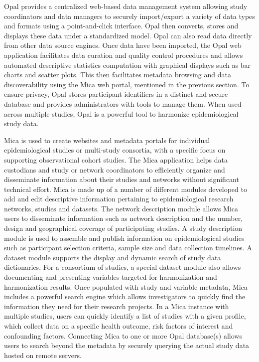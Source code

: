 Opal provides a centralized web-based data management system allowing study coordinators and data managers to securely import/export a variety of data types and formats using a point-and-click interface.
Opal then converts, stores and displays these data under a standardized model.
Opal can also read data directly from other data source engines.
Once data have been imported, the Opal web application facilitates data curation and quality control procedures and allows automated descriptive statistics computation with graphical displays such as bar charts and scatter plots.
This then facilitates metadata browsing and data discoverability using the Mica web portal, mentioned in the previous section.
To ensure privacy, Opal stores participant identifiers in a distinct and secure database and provides administrators with tools to manage them.
When used across multiple studies, Opal is a powerful tool to harmonize epidemiological study data.

Mica is used to create websites and metadata portals for individual epidemiological
studies or multi-study consortia, with a specific focus on supporting observational
cohort studies.
The Mica application helps data custodians and study or network coordinators to
efficiently organize and disseminate information about their studies and networks
without significant technical effort.
Mica is made up of a number of different modules developed to add and edit descriptive
information pertaining to epidemiological research networks, studies and datasets.
The network description module allows Mica users to disseminate information such as
network description and the number, design and geographical coverage of participating
studies.
A study description module is used to assemble and publish information on
epidemiological studies such as participant selection criteria, sample size and data
collection timelines.
A dataset module supports the display and dynamic search of study data dictionaries.
For a consortium of studies, a special dataset module also allows documenting and
presenting variables targeted for harmonization and harmonization results.
Once populated with study and variable metadata, Mica includes a powerful search engine
which allows investigators to quickly find the information they need for their research
projects.
In a Mica instance with multiple studies, users can quickly identify a list of studies
with a given profile, which collect data on a specific health outcome, risk factors of
interest and confounding factors.
Connecting Mica to one or more Opal database(s) allows users to search beyond the metadata by securely querying the actual
study data hosted on remote servers.


